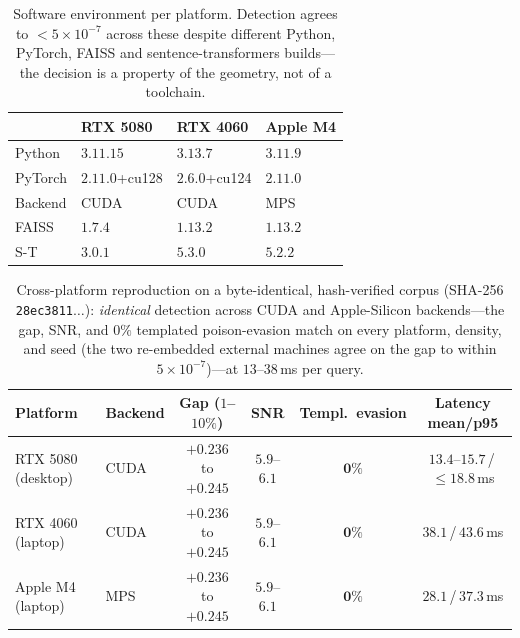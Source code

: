 \documentclass[10pt,journal,compsoc]{IEEEtran}
\begin{document}
\begin{table}[H]
\centering
\caption{Software environment per platform. Detection agrees to $<5\times10^{-7}$ across these
despite different Python, PyTorch, FAISS and sentence-transformers builds---the decision is a
property of the geometry, not of a toolchain.}
\label{tab:env}
\setlength{\tabcolsep}{3.5pt}
\begin{tabular}{llll}
\toprule
 & RTX 5080 & RTX 4060 & Apple M4 \\
\midrule
Python  & $3.11.15$ & $3.13.7$ & $3.11.9$ \\
PyTorch & $2.11.0$+cu128 & $2.6.0$+cu124 & $2.11.0$ \\
Backend & CUDA & CUDA & MPS \\
FAISS   & $1.7.4$ & $1.13.2$ & $1.13.2$ \\
S-T     & $3.0.1$ & $5.3.0$ & $5.2.2$ \\
\bottomrule
\end{tabular}
\end{table}

\begin{table}[t]
\centering
\caption{Cross-platform reproduction on a byte-identical, hash-verified corpus (SHA-256
\texttt{28ec3811}$\dots$): \emph{identical} detection across CUDA and Apple-Silicon
backends---the gap, SNR, and $0\%$ templated poison-evasion match on every platform,
density, and seed (the two re-embedded external machines agree on the gap to within
$5\times10^{-7}$)---at $13$--$38$\,ms per query.}
\label{tab:xplat}
\begin{tabular}{llcccc}
\toprule
Platform & Backend & Gap ($1$--$10\%$) & SNR & Templ.\ evasion & Latency mean/p95 \\
\midrule
RTX 5080 (desktop) & CUDA & $+0.236$ to $+0.245$ & $5.9$--$6.1$ & $\mathbf{0\%}$ & $13.4$--$15.7$\,/\,$\le\!18.8$\,ms \\
RTX 4060 (laptop) & CUDA & $+0.236$ to $+0.245$ & $5.9$--$6.1$ & $\mathbf{0\%}$ & $38.1$\,/\,$43.6$\,ms \\
Apple M4 (laptop) & MPS & $+0.236$ to $+0.245$ & $5.9$--$6.1$ & $\mathbf{0\%}$ & $28.1$\,/\,$37.3$\,ms \\
\bottomrule
\end{tabular}
\end{table}
\end{document}

